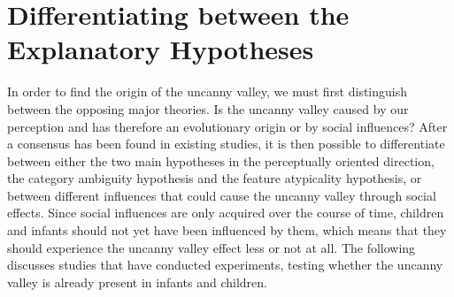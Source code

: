 \section{Differentiating between the Explanatory Hypotheses}
In order to find the origin of the uncanny valley, we must first distinguish between the opposing major theories. Is the uncanny valley caused by our perception and has therefore an evolutionary origin or by social influences? After a consensus has been found in existing studies, it is then possible to differentiate between either the two main hypotheses in the perceptually oriented direction, the category ambiguity hypothesis and the feature atypicality hypothesis, or between different influences that could cause the uncanny valley through social effects. Since social influences are only acquired over the course of time, children and infants should not yet have been influenced by them, which means that they should experience the uncanny valley effect less or not at all. The following discusses studies that have conducted experiments, testing whether the uncanny valley is already present in infants and children.
